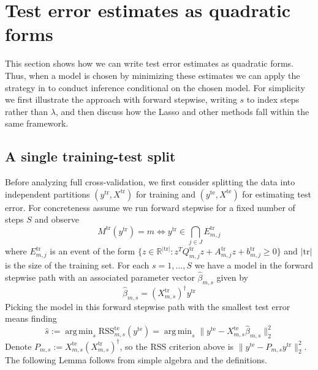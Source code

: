\documentclass[preprint]{imsart}
\newcommand{\tr}{\text{tr}}
\newcommand{\te}{\text{te}}
\DeclareMathOperator*{\argmin}{arg\,min}
\begin{document}
\section{Test error estimates as quadratic forms}
This section shows how we can write test error estimates as quadratic
forms. Thus, when a model is chosen by minimizing these estimates we
can apply the strategy in \cite{loftus2015groups} to conduct inference
conditional on the chosen model. For simplicity we first illustrate
the approach with forward stepwise, writing $s$ to index steps rather
than $\lambda$, and then discuss how the Lasso and other methods fall
within the same framework.

\subsection{A single training-test split}
Before analyzing full cross-validation, we first consider splitting
the data into independent partitions $(y^\tr, X^\tr)$ for training and
$(y^\te, X^\te)$ for estimating test error. For concreteness assume we
run forward stepwise for a fixed number of steps $S$ and observe
\begin{equation}
  \label{eq:trmodel}
  M^\tr(y^\tr) = m \iff y^\tr \in \bigcap_{j \in J} E^\tr_{m,j}
\end{equation}
where $E^\tr_{m,j}$ is an event of the form $\{ z \in \mathbb{R}^{|\tr|} :
z^TQ^\tr_{m,j}z + A^\tr_{m,j} z + b^\tr_{m,j} \geq 0
\}$ and $|\tr|$ is the size of the training set.
For each $s = 1, \ldots, S$ we have a model in the forward stepwise
path with an associated parameter vector $\hat \beta_{m,s}$ given by 
\begin{equation}
  \label{eq:trbeta}
  \hat \beta_{m,s} = (X^\tr_{m,s})^\dagger y^\tr
\end{equation}
Picking the model in this forward stepwise path with the smallest test
error means finding 
\begin{equation}
  \label{eq:terss}
  \hat s := \argmin_s \text{RSS}^\te_{m,s}(y^\te) = \argmin_s \| y^\te - X^\te_{m,s} \hat \beta_{m,s} \|_2^2
\end{equation}
Denote $P_{m,s} := X^\te_{m,s} (X^\tr_{m,s})^\dagger$, so the RSS
criterion above is $\| y^\te - P_{m,s} y^\tr \|_2^2$. The following
Lemma follows from simple algebra and the definitions.
\end{document}
